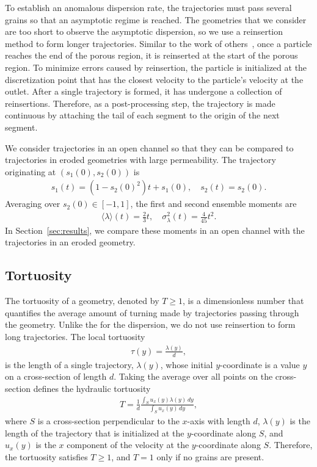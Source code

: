 \documentclass[preprint,10pt]{elsarticle}
\begin{document}
To establish an anomalous dispersion rate, the trajectories must pass
several grains so that an asymptotic regime is reached. The geometries
that we consider are too short to observe the asymptotic dispersion, so
we use a reinsertion method to form longer trajectories. Similar to the
work of others~\cite{dea-qua-bir-jua2018, puy-gou-den2019}, once a
particle reaches the end of the porous region, it is reinserted at the
start of the porous region.  To minimize errors caused by reinsertion,
the particle is initialized at the discretization point that has the
closest velocity to the particle's velocity at the outlet.  After a
single trajectory is formed, it has undergone a collection of
reinsertions.  Therefore, as a post-processing step, the trajectory is
made continuous by attaching the tail of each segment to the origin of
the next segment.  

We consider trajectories in an open channel so that they can be compared
to trajectories in eroded geometries with large permeability.  The
trajectory originating at $(s_1(0),s_2(0))$ is
\begin{align}
  s_1(t) = (1-s_2(0)^2)t + s_1(0), \quad
  s_2(t) = s_2(0).
\end{align}
Averaging over $s_2(0) \in [-1,1]$, the first and second ensemble
moments are
\begin{align}
  \langle \lambda \rangle (t) = \frac{2}{3}t, \quad 
    \sigma_\lambda^2(t) = \frac{4}{45}t^2.
\end{align}
In Section~\ref{sec:results}, we compare these moments in an open
channel with the trajectories in an eroded geometry.


\subsection{Tortuosity}
The tortuosity of a geometry, denoted by $T \geq 1$, is a dimensionless
number that quantifies the average amount of turning made by
trajectories passing through the geometry.  Unlike the for the
dispersion, we do not use reinsertion to form long trajectories.  The
local tortuosity
\begin{align}
  \tau(y) = \frac{\lambda(y)}{d},
  \label{eqn:localTort}
\end{align}
is the length of a single trajectory, $\lambda(y)$, whose initial
$y$-coordinate is a value $y$ on a cross-section of length $d$.  Taking
the average over all points on the cross-section defines the hydraulic
tortuosity
\begin{align}
  T = \frac{1}{d}\frac{\displaystyle\int_{S}u_x(y)\lambda(y)\,dy}
  {\displaystyle\int_{S}u_x(y)\,dy},
  \label{eqn:tortuosity1}
\end{align}
where $S$ is a cross-section perpendicular to the $x$-axis with length
$d$, $\lambda(y)$ is the length of the trajectory that is initialized at
the $y$-coordinate along $S$, and $u_x(y)$ is the $x$ component of the
velocity at the $y$-coordinate along $S$.  Therefore, the tortuosity
satisfies $T \geq 1$, and $T=1$ only if no grains are present.  
\end{document}
